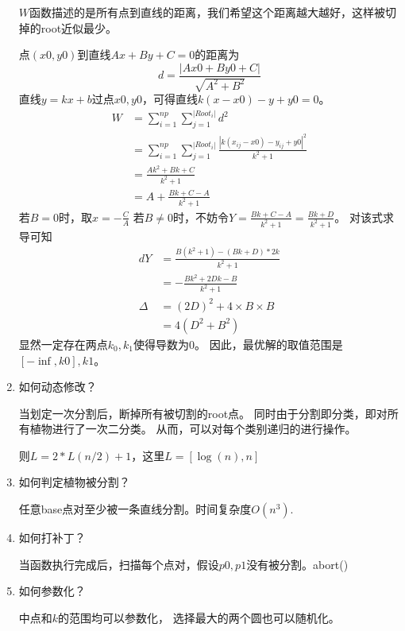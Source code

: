 \documentclass[UTF8]{ctexart}
\theoremstyle{definition}
\theoremstyle{remark}
\numberwithin{equation}{subsection}
\begin{document}
\begin{enumerate}[(1)]
		$W$函数描述的是所有点到直线的距离，我们希望这个距离越大越好，这样被切掉的root近似最少。
		
		点$(x0, y0)$到直线$Ax+By+C=0$的距离为
		\[
			d = \frac{|Ax0 + By0 + C|}{\sqrt{A^2+B^2}}
		\]
		直线$y=kx+b$过点$x0, y0$，可得直线$k(x-x0)-y+y0=0$。
		\begin{align*}
			W	&= \sum_{i=1}^{np}\sum_{j=1}^{|Root_i|} d^2	\\
				&= \sum_{i=1}^{np}\sum_{j=1}^{|Root_i|} \frac{|k(x_{ij}-x0) - y_{ij} + y0|^2}{k^2+1}	\\
				&= \frac{Ak^2 + Bk + C}{k^2+1}	\\
				&= A + \frac{Bk + C - A}{k^2+1}
		\end{align*}
		若$B = 0$时，取$x = - \frac{C}{A}$
		若$B \neq 0$时，不妨令$Y = \frac{Bk + C - A} {k^2+1} = \frac{Bk + D} {k^2+1}$。
		对该式求导可知
		\begin{align*}
			dY 	&= \frac{B(k^2+1) - (Bk+D)*2k} {k^2+1}	\\
				&= - \frac{Bk^2 + 2Dk - B} {k^2+1}	\\
			\Delta	&= (2D)^2 + 4 \times B \times B	\\
					&= 4(D^2 + B^2)
		\end{align*}
		显然一定存在两点$k_0, k_1$使得导数为0。
		因此，最优解的取值范围是$[-\inf, k0], k1$。
		
		\item 如何动态修改？
		
		当划定一次分割后，断掉所有被切割的root点。
		同时由于分割即分类，即对所有植物进行了一次二分类。
		从而，可以对每个类别递归的进行操作。
		
		则$L = 2*L(n/2) + 1$，这里$L = [\log(n), n]$
		
		\item 如何判定植物被分割？
		
		任意base点对至少被一条直线分割。时间复杂度$O(n ^ 3)$.
		
		\item 如何打补丁？
		
		当函数执行完成后，扫描每个点对，假设$p0, p1$没有被分割。abort()
		
		\item 如何参数化？
		
		中点和$k$的范围均可以参数化，
		选择最大的两个圆也可以随机化。
		
	\end{enumerate}
	
\end{document}
